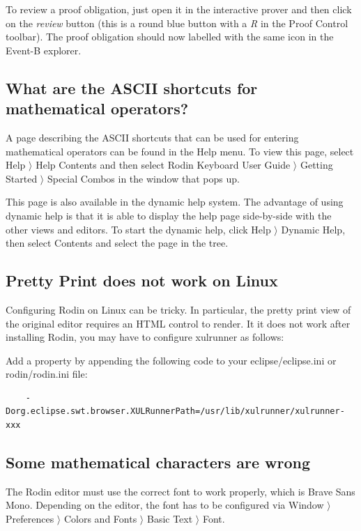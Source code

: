 To review a proof obligation, just open it in the interactive prover and then click on the \emph{review} button (this is a round blue button with a \emph{R} in the \textsf{Proof Control} toolbar). The proof obligation should now labelled with the same icon in the Event-B explorer. 

\subsection{What are the ASCII shortcuts for mathematical operators?}

A page describing the ASCII shortcuts that can be used for entering mathematical operators can be found in the \textsf{Help} menu. To view this page, select \textsf{Help $\rangle$ Help Contents} and then select \textsf{Rodin Keyboard User Guide $\rangle$ Getting Started $\rangle$ Special Combos} in the window that pops up. 

This page is also available in the dynamic help system. The advantage of using dynamic help is that it is able to display the help page side-by-side with the other views and editors. To start the dynamic help, click \textsf{Help $\rangle$ Dynamic Help}, then select \textsf{Contents} and select the page in the tree. 

\subsection{Pretty Print does not work on Linux}

Configuring Rodin on Linux can be tricky.  In particular, the pretty print view of the original editor requires an HTML control to render.  It it does not work after installing Rodin, you may have to configure xulrunner as follows:

Add a property by appending the following code to your \textsf{eclipse/eclipse.ini} or \textsf{rodin/rodin.ini} file: 

\begin{verbatim} 
	-Dorg.eclipse.swt.browser.XULRunnerPath=/usr/lib/xulrunner/xulrunner-xxx 
\end{verbatim} 

\subsection{Some mathematical characters are wrong}

The Rodin editor must use the correct font to work properly, which is \textsf{Brave Sans Mono}. Depending on the editor, the font has to be configured via Window $\rangle$ Preferences $\rangle$ Colors and Fonts $\rangle$ Basic Text $\rangle$ Font.

